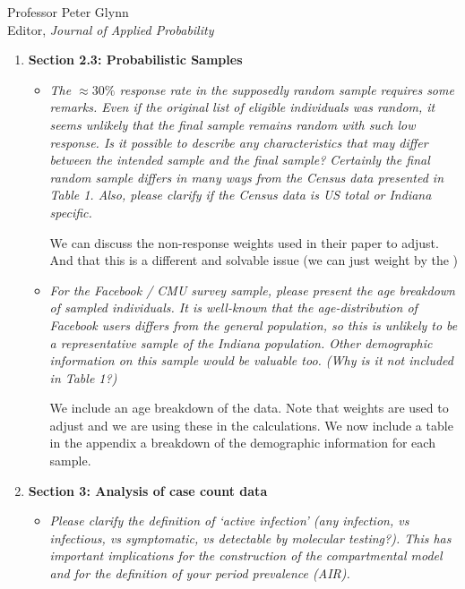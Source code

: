 \documentclass[11pt]{letter} %
\begin{document}
\begin{letter}{Professor
	Peter Glynn\\
	Editor, {\em Journal of Applied Probability}}
\begin{enumerate}
\begin{itemize}
	Clarify that Indiana released a lot of aggregate information.  Two distinct goals: (1) what can we say with additional surveys but not additional testing, (2) guide health departments who have access to
	\vspace{5mm}
	\item {\it A timeline of restrictions and testing eligibility would be a useful addition to Section 2.2.1. Also, what there no time period where testing in Indiana was restricted on the basis of travel history or suspected exposure?}
	\vspace{5mm}

	We have a timeline
	\vspace{5mm}
\end{itemize}
\item {\bf Section 2.3: Probabilistic Samples}
\begin{itemize}
	\item {\it The $\approx 30\%$ response rate in the supposedly random sample requires some remarks. Even if the original list of eligible individuals was random, it seems unlikely that the final sample remains random with such low response. Is it possible to describe any characteristics that may differ between the intended sample and the final sample? Certainly the final random sample differs in many ways from the Census data presented in Table 1. Also, please clarify if the Census data is US total or Indiana specific. }
	\vspace{5mm}

	We can discuss the non-response weights used in their paper to adjust.  And that this is a different and solvable issue (we can just weight by the )
	\vspace{5mm}
	\item {\it For the Facebook / CMU survey sample, please present the age breakdown of sampled individuals. It is well-known that the age-distribution of Facebook users differs from the general population, so this is unlikely to be a representative sample of the Indiana population. Other demographic information on this sample would be valuable too. (Why is it not included in Table 1?)}
	\vspace{5mm}

	We include an age breakdown of the data.  Note that weights are used to adjust and we are using these in the calculations.  We now include a table in the appendix a breakdown of the demographic information for each sample.
	\vspace{5mm}
\end{itemize}
\item {\bf Section 3: Analysis of case count data}
\begin{itemize}
	\item {\it Please clarify the definition of ‘active infection’ (any infection, vs infectious, vs symptomatic, vs detectable by molecular testing?). This has important implications for the construction of the compartmental model and for the definition of your period prevalence (AIR).}
	\vspace{5mm}


\end{itemize}
\end{enumerate}
\end{letter}
\end{document}
